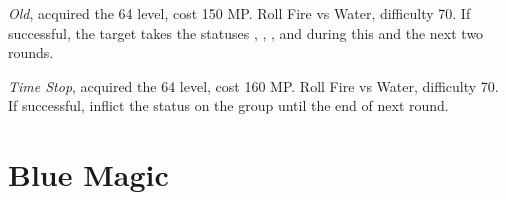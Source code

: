 \begin{multicols}{2}
    \textit{Old}, acquired the 64 level, cost 150 MP\@. Roll Fire vs Water, difficulty 70. If successful, the target takes the statuses , , ,  and  during this and the next two rounds.
    
    \textit{Time Stop}, acquired the 64 level, cost 160 MP\@. Roll Fire vs Water, difficulty 70. If successful, inflict the  status on the group until the end of next round.

\end{multicols}

\section{Blue Magic}\label{sec:magic-blue}
